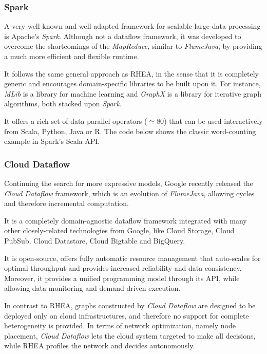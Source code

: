 \documentclass[sigplan,review,anonymous]{acmart}
\begin{document}
\subsubsection{Spark}

A very well-known and well-adapted framework for scalable large-data processing
is Apache's \textit{Spark}. Although not a
dataflow framework, it was developed to overcome the shortcomings of the
\textit{MapReduce}, similar to \textit{FlumeJava}, by providing a much more
efficient and flexible runtime.

It follows the same general approach as \textsc{RHEA}, in the sense that it is
completely generic and encourages domain-specific libraries to be built upon it.
For instance, \textit{MLib} is a library for machine learning and
\textit{GraphX} is a library for iterative graph algorithms, both stacked upon
\textit{Spark}.

It offers a rich set of data-parallel operators ($\simeq 80$) that can be used
interactively from Scala, Python, Java or R. The code below shows the classic
word-counting example in Spark's Scala API.


\subsubsection{Cloud Dataflow}

Continuing the search for more expressive models, Google recently released the
\textit{Cloud Dataflow} framework,
which is an evolution of \textit{FlumeJava}\cite{flumejava}, allowing cycles and
therefore incremental computation.

It is a completely domain-agnostic dataflow framework integrated with many other
closely-related technologies from Google, like Cloud Storage, Cloud PubSub,
Cloud Datastore, Cloud Bigtable and BigQuery.

It is open-source, offers fully automatic resource management that auto-scales
for optimal throughput and provides increased reliability and data consistency.
Moreover, it provides a unified programming model through its API, while
allowing data monitoring and demand-driven execution.

In contrast to \textsc{RHEA}, graphs constructed by \textit{Cloud Dataflow} are
designed to be deployed only on cloud infrastructures, and therefore no support
for complete heterogeneity is provided. In terms of network optimization, namely
node placement,  \textit{Cloud Dataflow} lets the cloud system targeted to make
all decisions, while \textsc{RHEA} profiles the network and decides
autonomously.
\end{document}
